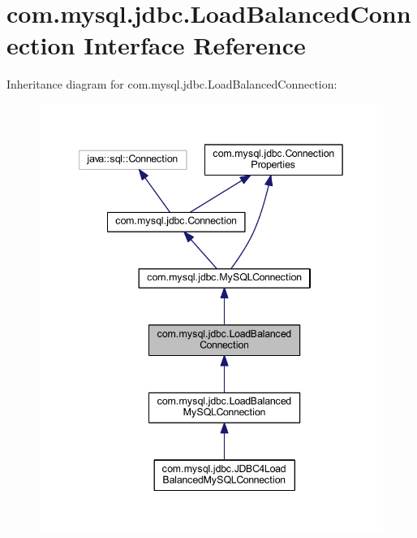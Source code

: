\hypertarget{interfacecom_1_1mysql_1_1jdbc_1_1_load_balanced_connection}{}\section{com.\+mysql.\+jdbc.\+Load\+Balanced\+Connection Interface Reference}
\label{interfacecom_1_1mysql_1_1jdbc_1_1_load_balanced_connection}


Inheritance diagram for com.\+mysql.\+jdbc.\+Load\+Balanced\+Connection\+:
\nopagebreak
\begin{figure}[H]
\begin{center}
\leavevmode
\includegraphics[width=342pt]{interfacecom_1_1mysql_1_1jdbc_1_1_load_balanced_connection__inherit__graph}
\end{center}
\end{figure}


